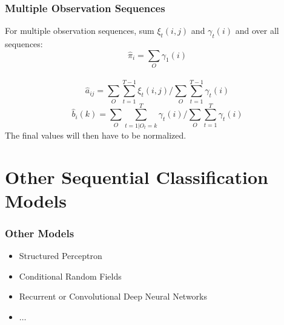 \documentclass{beamer}
\begin{document}
\begin{frame}
    \frametitle{Multiple Observation Sequences}
    For multiple observation sequences, sum $\xi_t(i,j)$ and $\gamma_t(i)$ and
    over all sequences:
    \begin{displaymath}
        \hat{\pi}_i = \sum_{O}\gamma_1(i)
    \end{displaymath}\\
    \begin{displaymath}
        \hat{a}_{ij} = \sum_{O}\sum_{t=1}^{T-1}\xi_t(i,j) \Bigg/ \sum_{O}\sum_{t=1}^{T-1}\gamma_t(i)
    \end{displaymath}
    \vfill
    \begin{displaymath}
        \hat{b}_i(k) = \sum_{O}\sum_{t=1 | O_t=k}^T\gamma_t(i) \Bigg/ \sum_{O}\sum_{t=1}^T\gamma_t(i)
    \end{displaymath}
    The final values will then have to be normalized.
\end{frame}



\section{Other Sequential Classification Models}

\begin{frame} \frametitle{Other Models}
  
  \begin{itemize}
  \item Structured Perceptron
  \item Conditional Random Fields
  \item Recurrent or Convolutional Deep Neural Networks
  \item $\ldots$
  \end{itemize}
 
\end{frame}


  
  
\end{document}
